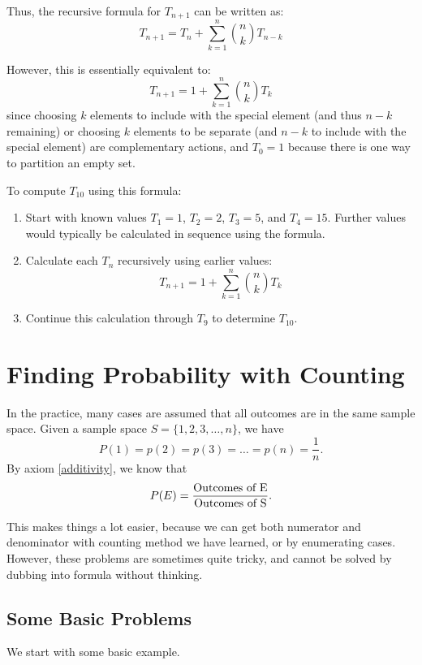 \begin{solution}
            Thus, the recursive formula for \( T_{n+1} \) can be written as:
            \[ T_{n+1} = T_n + \sum_{k=1}^n \binom{n}{k} T_{n-k} \]

            However, this is essentially equivalent to:
            \[ T_{n+1} = 1 + \sum_{k=1}^n \binom{n}{k} T_k \]
            since choosing \( k \) elements to include with the special element (and thus \( n-k \) remaining) or choosing \( k \) elements to be separate (and \( n-k \) to include with the special element) are complementary actions, and \( T_0 = 1 \) because there is one way to partition an empty set.

            To compute \( T_{10} \) using this formula:
            \begin{enumerate}
                \item Start with known values \( T_1 = 1 \), \( T_2 = 2 \), \( T_3 = 5 \), and \( T_4 = 15 \). Further values would typically be calculated in sequence using the formula.
                \item Calculate each \( T_n \) recursively using earlier values:
                \[ T_{n+1} = 1 + \sum_{k=1}^n \binom{n}{k} T_k \]
                \item Continue this calculation through \( T_9 \) to determine \( T_{10} \).
            \end{enumerate}
            \end{solution}
    \section{Finding Probability with Counting}
    In the practice, many cases are assumed that all outcomes are in the same sample space.
    Given a sample space $S = \{1,2,3,\dots,n\}$, we have 
    \begin{equation}
        P(1) = p(2) = p(3)=\dots = p(n) = \frac{1}{n}.
    \end{equation}
    By axiom \ref{additivity}, we know that
    \begin{equation}
        P(E) = \frac{\text{Outcomes of E}}{\text{Outcomes of S}}.
    \end{equation} 

    This makes things a lot easier, because we can get both numerator and denominator with counting 
    method we have learned, or by enumerating cases. However, these problems are sometimes quite tricky, and cannot be solved
    by dubbing into formula without thinking.

    \subsection{Some Basic Problems}
    We start with some basic example.

